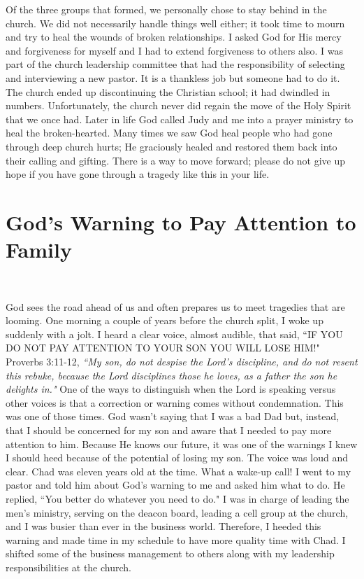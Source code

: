 \documentclass[oneside,12pt]{book}
\begin{document}
Of the three groups that formed, we personally chose to stay behind in the church. We did not necessarily handle things well either; it took time to mourn and try to heal the wounds of broken relationships. I asked God for His mercy and forgiveness for myself and I had to extend forgiveness to others also. I was part of the church leadership committee that had the responsibility of selecting and interviewing a new pastor. It is a thankless job but someone had to do it. The church ended up discontinuing the Christian school; it had dwindled in numbers. Unfortunately, the church never did regain the move of the Holy Spirit that we once had. Later in life God called Judy and me into a prayer ministry to heal the broken-hearted. Many times we saw God heal people who had gone through deep church hurts; He graciously healed and restored them back into their calling and gifting. There is a way to move forward; please do not give up hope if you have gone through a tragedy like this in your life.


\section{God's Warning to Pay Attention to Family}
\

God sees the road ahead of us and often prepares us to meet tragedies that are looming. One morning a couple of years before the church split, I woke up suddenly with a jolt. I heard a clear voice, almost audible, that said, ``IF YOU DO NOT PAY ATTENTION TO YOUR SON YOU WILL LOSE HIM!" Proverbs 3:11-12, \textit{``My son, do not despise the Lord's discipline, and do not resent this rebuke, because the Lord disciplines those he loves, as a father the son he delights in."} One of the ways to distinguish when the Lord is speaking versus other voices is that a correction or warning comes without condemnation. This was one of those times. God wasn't saying that I was a bad Dad but, instead, that I should be concerned for my son and aware that I needed to pay more attention to him. Because He knows our future, it was one of the warnings I knew I should heed because of the potential of losing my son. The voice was loud and clear. Chad was eleven years old at the time. What a wake-up call! I went to my pastor and told him about God's warning to me and asked him what to do. He replied, ``You better do whatever you need to do." I was in charge of leading the men's ministry, serving on the deacon board, leading a cell group at the church, and I was busier than ever in the business world. Therefore, I heeded this warning and made time in my schedule to have more quality time with Chad. I shifted some of the business management to others along with my leadership responsibilities at the church.
\end{document}
